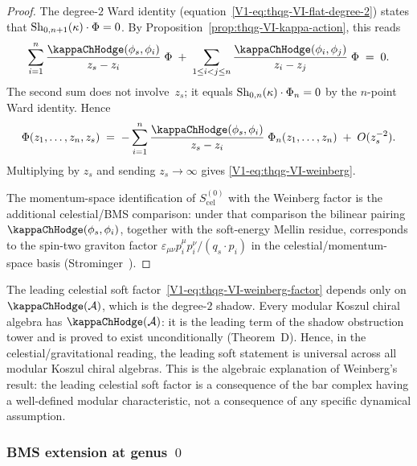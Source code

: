 \begin{proof}
The degree-$2$ Ward identity
(equation~\eqref{V1-eq:thqg-VI-flat-degree-2}) states that
$\operatorname{Sh}_{0,n+1}(\kappa) \cdot \Phi = 0$.
By Proposition~\ref{prop:thqg-VI-kappa-action}, this reads
\[
\sum_{i=1}^{n}
\frac{\kappaChHodge(\phi_s, \phi_i)}{z_s - z_i}\;\Phi
\;+\;
\sum_{1 \leq i < j \leq n}
\frac{\kappaChHodge(\phi_i, \phi_j)}{z_i - z_j}\;\Phi
\;=\; 0.
\]
The second sum does not involve~$z_s$; it equals
$\operatorname{Sh}_{0,n}(\kappa) \cdot \Phi_n = 0$ by the $n$-point Ward
identity. Hence
\[
\Phi(z_1, \dotsc, z_n, z_s)
\;=\;
-\sum_{i=1}^{n}
\frac{\kappaChHodge(\phi_s, \phi_i)}{z_s - z_i}\;\Phi_n(z_1, \dotsc, z_n)
\;+\; O(z_s^{-2}).
\]
Multiplying by $z_s$ and sending $z_s \to \infty$ gives
\eqref{V1-eq:thqg-VI-weinberg}.

The momentum-space identification of
$S^{(0)}_{\mathrm{cel}}$ with the Weinberg factor is the additional
celestial/BMS comparison: under that comparison the bilinear pairing
$\kappaChHodge(\phi_s, \phi_i)$, together with the soft-energy
Mellin residue, corresponds to the spin-two graviton factor
\(\varepsilon_{\mu\nu}p_i^\mu p_i^\nu/(q_s\cdot p_i)\) in the
celestial/momentum-space basis
(Strominger~\cite{Strominger18}).
\end{proof}

\begin{remark}
The leading celestial soft factor~\eqref{V1-eq:thqg-VI-weinberg-factor} depends
only on $\kappaChHodge(\cA)$, which is the degree-$2$ shadow. Every
modular Koszul chiral algebra has $\kappaChHodge(\cA)$: it is the
leading term of the shadow obstruction tower and is proved to exist
unconditionally (Theorem~D). Hence, in the celestial/gravitational
reading, the leading soft statement is universal across all
modular Koszul chiral algebras. This is the algebraic explanation of Weinberg's
result: the leading celestial soft factor is a consequence of the bar complex
having a well-defined modular characteristic, not a consequence of
any specific dynamical assumption.
\end{remark}

\subsubsection{BMS extension at genus~$0$}

